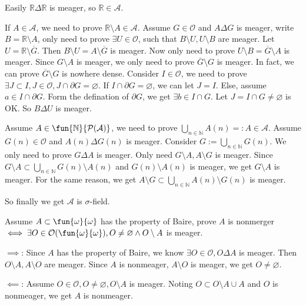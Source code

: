 \documentclass{ctexart}
\begin{document}
\begin{solution}
  Easily \(\mathbb{R} \Delta \mathbb{R}\) is meager, so \(\mathbb{R} \in \mathcal{A}\). 

  If \(A \in \mathcal{A}\), we need to prove \(\mathbb{R} \setminus A \in \mathcal{A}\). 
  Assume \(G \in \mathcal{O}\) and \( A \Delta G\) is meager, write \(B=\mathbb{R}\setminus A\), 
  only need to prove \(\exists U \in \mathcal{O}\), such that \(B\setminus U,U\setminus B\) are meager. 
  Let \(U=\mathbb{R} \setminus \overline{G}\). Then \(B \setminus U = A \setminus \overline{G}\) is meager. 
  Now only need to prove \(U \setminus B = \overline{ G}\setminus A\) is meager. 
  Since \(G \setminus A\) is meager, we only need to prove \(\overline{G}\setminus G\) is meager. 
  In fact, we can prove \(\overline{G}\setminus G\) is nowhere dense. 
  Consider \(I \in \mathcal{O}\), we need to prove \(\exists J \subset I,J \in \mathcal{O}, J \cap \partial G = \varnothing\). 
  If \(I \cap \partial G = \varnothing\), we can let \(J = I\). 
  Else, assume \( a \in I \cap \partial G\). Form the defination of \(\partial G\), 
  we get \(\exists b \in I \cap G\). Let \(J = I \cap G \neq \varnothing\) is OK. 
  So \(B \Delta U\) is meager. 

  Assume \(A \in \fun{\mathbb{N}}{\mathcal{P}(\mathcal{A})}\), we need to prove \(\bigcup_{n \in \mathbb{N}} A(n)=:A \in \mathcal{A}\). 
  Assume \(G(n) \in \mathcal{O}\) and \(A(n) \Delta G(n)\) is meager. Consider \(G:= \bigcup_{ n \in \mathbb{N}} G(n)\). 
  We only need to prove \(G \Delta A\) is meager. Only need \(G \setminus A,A \setminus G\) is meager. 
  Since \(G \setminus A \subset \bigcup_{n \in \mathbb{N}} G(n) \setminus A(n)\) and \(G(n)\setminus A(n)\) is meager, we get \(G \setminus A\) is meager. 
  For the same reason, we get \(A \setminus G \subset \bigcup_{n \in \mathbb{N}} A(n)\setminus G(n)\) is meager. 

  So finally we get \(\mathcal{A}\) is \(\sigma\)-field. 
\end{solution}

\begin{problem}
  Assume \(A \subset \fun{\omega}{\omega}\) has the property of Baire, prove \(A\) is nonmerger \(\iff \exists O \in \mathcal{O}(\fun{\omega}{\omega}),O \neq \varnothing \wedge O\setminus A\) is meager. 
\end{problem}

\begin{solution}
  \(\implies\): Since \(A\) has the property of Baire, we know \(\exists O \in \mathcal{O},O \Delta A\) is meager. 
  Then \(O \setminus A,A \setminus O\) are meager. Since \(A\) is nonmeager, \(A \setminus O\) is meager, we get \(O \neq \varnothing\). 

  \(\impliedby\): Assume \(O \in \mathcal{O}, O \neq \varnothing, O \setminus A\) is meager. 
  Noting \(O \subset O \setminus A \cup A\) and \(O\) is nonmeager, we get \(A\) is nonmeager. 
\end{solution}

\begin{problem}
  
\end{problem}
\end{document}
